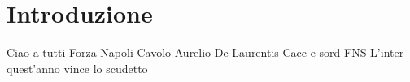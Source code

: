 \chapter*{Introduzione}
Ciao a tutti
Forza Napoli
Cavolo
Aurelio De Laurentis Cacc e sord
FNS
L'inter quest'anno vince lo scudetto
